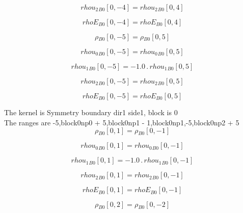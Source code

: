 \documentclass{article}
\begin{document}
\begin{dmath}{rhou_{2}{_{B0}}}[{0,-4}] = {rhou_{2}{_{B0}}}[{0,4}]\end{dmath}

\begin{dmath}{rhoE{_{B0}}}[{0,-4}] = {rhoE{_{B0}}}[{0,4}]\end{dmath}

\begin{dmath}{\rho{_{B0}}}[{0,-5}] = {\rho{_{B0}}}[{0,5}]\end{dmath}

\begin{dmath}{rhou_{0}{_{B0}}}[{0,-5}] = {rhou_{0}{_{B0}}}[{0,5}]\end{dmath}

\begin{dmath}{rhou_{1}{_{B0}}}[{0,-5}] = - 1.0 \,.\, {rhou_{1}{_{B0}}}[{0,5}]\end{dmath}

\begin{dmath}{rhou_{2}{_{B0}}}[{0,-5}] = {rhou_{2}{_{B0}}}[{0,5}]\end{dmath}

\begin{dmath}{rhoE{_{B0}}}[{0,-5}] = {rhoE{_{B0}}}[{0,5}]\end{dmath}

\noindent The kernel is Symmetry boundary dir1 side1, block is 0\\\noindent The ranges are -5,block0np0 + 5,block0np1 - 1,block0np1,-5,block0np2 + 5\\\begin{dmath}{\rho{_{B0}}}[{0,1}] = {\rho{_{B0}}}[{0,-1}]\end{dmath}

\begin{dmath}{rhou_{0}{_{B0}}}[{0,1}] = {rhou_{0}{_{B0}}}[{0,-1}]\end{dmath}

\begin{dmath}{rhou_{1}{_{B0}}}[{0,1}] = - 1.0 \,.\, {rhou_{1}{_{B0}}}[{0,-1}]\end{dmath}

\begin{dmath}{rhou_{2}{_{B0}}}[{0,1}] = {rhou_{2}{_{B0}}}[{0,-1}]\end{dmath}

\begin{dmath}{rhoE{_{B0}}}[{0,1}] = {rhoE{_{B0}}}[{0,-1}]\end{dmath}

\begin{dmath}{\rho{_{B0}}}[{0,2}] = {\rho{_{B0}}}[{0,-2}]\end{dmath}
\end{document}
